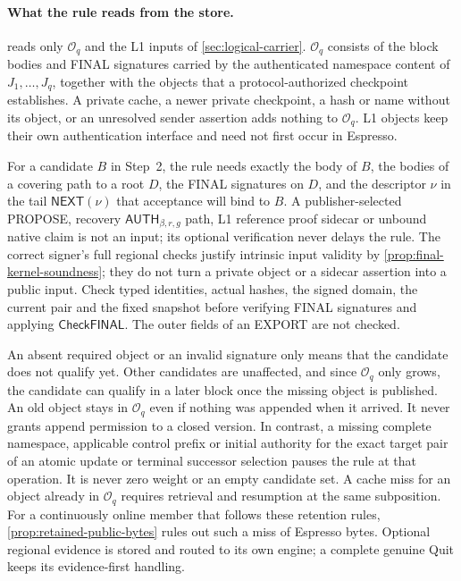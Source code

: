 \documentclass[11pt,a4paper]{article}
\newcommand{\tagg}[1]{\ensuremath{\mathsf{#1}}}
\newcounter{protocol}
\begin{document}
\paragraph{What the rule reads from the store.}
\label{sec:record-completeness}
 reads only $\mathcal O_q$ and the L1 inputs of
\cref{sec:logical-carrier}. $\mathcal O_q$ consists of the block bodies
and FINAL signatures carried by the authenticated namespace content of
$J_1,\ldots,J_q$, together with the objects that a protocol-authorized
checkpoint establishes. A private cache, a newer private checkpoint, a
hash or name without its object, or an unresolved sender assertion adds
nothing to $\mathcal O_q$. L1 objects keep their own authentication
interface and need not first occur in Espresso.

For a candidate $B$ in Step~2, the rule needs exactly the body of $B$,
the bodies of a covering path to a root $D$, the FINAL signatures on
$D$, and the descriptor $\nu$ in the tail $\tagg{NEXT}(\nu)$ that
acceptance will bind to
$B$. A publisher-selected PROPOSE,
recovery $\tagg{AUTH}_{\beta,r,g}$ path, L1 reference proof sidecar or unbound
native claim is not an input; its optional verification never delays the
rule. The correct signer's full regional checks justify intrinsic input
validity by \cref{prop:final-kernel-soundness}; they do not turn a
private object or a sidecar assertion into a public input. Check typed
identities, actual hashes, the signed domain, the current pair and the
fixed snapshot before verifying FINAL signatures and applying
\tagg{CheckFINAL}. The outer fields of an EXPORT are not checked.

An absent required object or an invalid signature only means that the
candidate does not qualify yet. Other candidates are unaffected, and
since $\mathcal O_q$ only grows, the candidate can qualify in a later
block once the missing object is published. An old object stays in
$\mathcal O_q$ even if nothing was appended when it arrived. It never
grants append permission to a closed version. In contrast, a missing
complete namespace, applicable control prefix or initial authority for
the exact target pair of an atomic update or terminal successor selection
pauses the rule at that operation. It is never zero
weight or an empty candidate set. A cache miss for an object already in
$\mathcal O_q$ requires retrieval and resumption at the same
subposition. For a continuously online member that follows these
retention rules, \cref{prop:retained-public-bytes} rules out such a miss
of Espresso bytes. Optional regional evidence is
stored and routed to its own engine; a complete genuine Quit keeps its
evidence-first handling.
\end{document}
